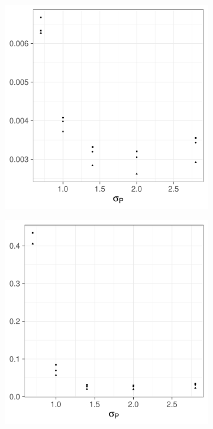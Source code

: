 \begin{figure}[htbp]
    \centering
    \begin{subfigure}[t]{0.49\textwidth}
        \includegraphics[width=\textwidth]{results/by_population_spread/MIAE-vs-population-spread}
        \label{fig:other_measures:pop_spread:miae}
    \end{subfigure}
    \begin{subfigure}[t]{0.49\textwidth}
        \includegraphics[width=\textwidth]{results/by_population_spread/maxerr-vs-population-spread}

\end{subfigure}
\end{figure}
